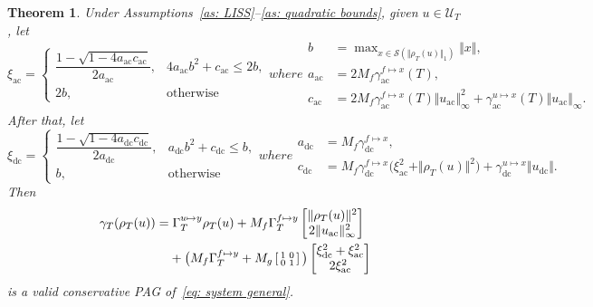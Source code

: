 \documentclass[letterpaper, 10 pt, conference]{ieeeconf}
\newcommand{\ac}{_\mathrm{ac}}
\newcommand{\dc}{_\mathrm{dc}}
\newcommand{\Guy}{\Gamma^{u \mapsto y}}
\newcommand{\Gfy}{\Gamma^{f \mapsto y}}
\newcommand{\gux}{\gamma^{u \mapsto x}}
\newcommand{\gfx}{\gamma^{f \mapsto x}}
\newcommand{\pb}[1]{\big( #1 \big)}
\newcommand{\norm}[1]{\Vert #1 \Vert}
\newcommand{\bracksx}[1]{\left\lbrack #1 \right\rbrack}
\newcommand{\calU}{\mathcal{U}}
\newcommand{\calS}{\mathcal{S}}
\newtheorem{theorem}{Theorem}
\begin{document}
\begin{theorem}
    \label{th: nonlinear PAG}
    Under Assumptions~\ref{as: LISS}--\ref{as: quadratic bounds}, given $u \in \calU_T$, let
    \begin{subequations}
        \label{eq: solution xi ac}
        \begin{equation}
            \xi\ac = \begin{cases}
                \dfrac{1 - \sqrt{1 - 4 a\ac c\ac}}{2a\ac},
                & 4a\ac b^2 + c\ac \leq 2b, \\
                2b, & \mathrm{otherwise}
            \end{cases}
        \end{equation}
        where
        \begin{align}
            b &= \max\nolimits_{x \in \calS(\norm{\rho_T(u)}_1)} \norm{x}, \\
            a\ac &= 2M_f \gfx\ac(T), \\
            c\ac &= 2M_f \gfx\ac(T) \norm{u\ac}_\infty^2 + \gux\ac(T) \norm{u\ac}_\infty.
        \end{align}
    \end{subequations}
    After that, let
    \begin{subequations}
        \label{eq: solution xi dc}
        \begin{equation}
            \xi\dc = \begin{cases}
                \dfrac{1 - \sqrt{1 - 4 a\dc c\dc}}{2a\dc},
                & a\dc b^2 + c\dc \leq b, \\
                b, & \mathrm{otherwise}
            \end{cases}
        \end{equation}
        where
        \begin{align}
            a\dc &= M_f \gfx\dc, \\
            c\dc &= M_f \gfx\dc \pb{\xi\ac^2 + \norm{\rho_T(u)}^2} + \gux\dc \norm{u\dc}.
        \end{align}
    \end{subequations}
    Then
    \begin{align}
        \gamma_T(\rho_T(u)) &= \Guy_T \rho_T(u)
        + M_f \Gfy_T \begin{bmatrix}
            \norm{\rho_T(u)}^2 \\ 2\norm{u\ac}_\infty^2
        \end{bmatrix} \notag \\
        \label{eq: nonlinear PAG}
        &\phantom{{}=} + \pb{M_f \Gfy_T + M_g \bracksx{\begin{smallmatrix}
            1 & 0 \\ 0 & 1
        \end{smallmatrix}}} \begin{bmatrix}
            \xi\dc^2 + \xi\ac^2 \\ 2\xi\ac^2
        \end{bmatrix}
    \end{align}
    is a valid conservative PAG of~\eqref{eq: system general}.
\end{theorem}
\end{document}
